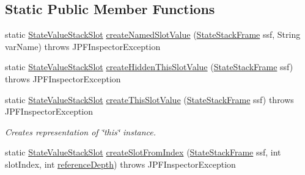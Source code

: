 \subsection*{Static Public Member Functions}
\begin{DoxyCompactItemize}
\item 
static \hyperlink{classgov_1_1nasa_1_1jpf_1_1inspector_1_1server_1_1programstate_1_1_state_value_stack_slot}{State\+Value\+Stack\+Slot} \hyperlink{classgov_1_1nasa_1_1jpf_1_1inspector_1_1server_1_1programstate_1_1_state_value_stack_slot_a7309c6c8a8f5b5b6a8d90ad82a01d66f}{create\+Named\+Slot\+Value} (\hyperlink{classgov_1_1nasa_1_1jpf_1_1inspector_1_1server_1_1programstate_1_1_state_stack_frame}{State\+Stack\+Frame} ssf, String var\+Name)  throws J\+P\+F\+Inspector\+Exception 
\item 
static \hyperlink{classgov_1_1nasa_1_1jpf_1_1inspector_1_1server_1_1programstate_1_1_state_value_stack_slot}{State\+Value\+Stack\+Slot} \hyperlink{classgov_1_1nasa_1_1jpf_1_1inspector_1_1server_1_1programstate_1_1_state_value_stack_slot_a6f47abb4089c30c528909120cf7b393a}{create\+Hidden\+This\+Slot\+Value} (\hyperlink{classgov_1_1nasa_1_1jpf_1_1inspector_1_1server_1_1programstate_1_1_state_stack_frame}{State\+Stack\+Frame} ssf)  throws J\+P\+F\+Inspector\+Exception 
\item 
static \hyperlink{classgov_1_1nasa_1_1jpf_1_1inspector_1_1server_1_1programstate_1_1_state_value_stack_slot}{State\+Value\+Stack\+Slot} \hyperlink{classgov_1_1nasa_1_1jpf_1_1inspector_1_1server_1_1programstate_1_1_state_value_stack_slot_a07adb0a7612962a7f2ee88d34c23f482}{create\+This\+Slot\+Value} (\hyperlink{classgov_1_1nasa_1_1jpf_1_1inspector_1_1server_1_1programstate_1_1_state_stack_frame}{State\+Stack\+Frame} ssf)  throws J\+P\+F\+Inspector\+Exception 
\begin{DoxyCompactList}\small\item\em Creates representation of \char`\"{}this\char`\"{} instance. \end{DoxyCompactList}\item 
static \hyperlink{classgov_1_1nasa_1_1jpf_1_1inspector_1_1server_1_1programstate_1_1_state_value_stack_slot}{State\+Value\+Stack\+Slot} \hyperlink{classgov_1_1nasa_1_1jpf_1_1inspector_1_1server_1_1programstate_1_1_state_value_stack_slot_a70dc032aac273da995c105699fd6f1ff}{create\+Slot\+From\+Index} (\hyperlink{classgov_1_1nasa_1_1jpf_1_1inspector_1_1server_1_1programstate_1_1_state_stack_frame}{State\+Stack\+Frame} ssf, int slot\+Index, int \hyperlink{classgov_1_1nasa_1_1jpf_1_1inspector_1_1server_1_1programstate_1_1_state_node_a55683618625dae46e8aa68d95811d6bb}{reference\+Depth})  throws J\+P\+F\+Inspector\+Exception 

\end{DoxyCompactItemize}
